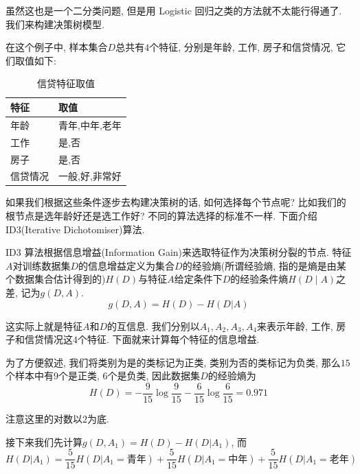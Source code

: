 \documentclass[a4paper,UTF8]{ctexart}
\theoremstyle{plain} \newtheorem{theorem}{定理}[section]
\theoremstyle{plain} \newtheorem{definition}{定义}[section]
\theoremstyle{plain} \newtheorem{lemma}{引理}[section]
\theoremstyle{plain} \newtheorem{proposition}{命题}[section]
\theoremstyle{plain} \newtheorem{example}{例}
\theoremstyle{plain} \newtheorem{remark}{注}
\theoremstyle{plain} \newtheorem{corollary}{推论}[section]
\begin{document}
虽然这也是一个二分类问题, 但是用 Logistic 回归之类的方法就不太能行得通了. 我们来构建决策树模型.

在这个例子中, 样本集合$D$总共有$4$个特征, 分别是年龄, 工作, 房子和信贷情况, 它们取值如下:
\begin{table}[!htb]
\centering
\caption{信贷特征取值}
\label{xindaivalue}
\begin{tabularx}{10cm}{XX}
  \hline
    \textbf{特征} & \textbf{取值}  \\
    \hline
    年龄   &  青年,中年,老年 \\
    \hline
    工作   &  是,否 \\
    \hline
    房子   &  是,否 \\
    \hline
    信贷情况   &  一般,好,非常好 \\
  \hline
\end{tabularx}
\end{table}

如果我们根据这些条件逐步去构建决策树的话, 如何选择每个节点呢? 比如我们的根节点是选年龄好还是选工作好? 不同的算法选择的标准不一样. 下面介绍 ID3(Iterative Dichotomiser)算法.

ID3 算法根据信息增益(Information Gain)来选取特征作为决策树分裂的节点. 特征$A$对训练数据集$D$的信息增益定义为集合$D$的经验熵(所谓经验熵, 指的是熵是由某个数据集合估计得到的)$H(D)$与特征$A$给定条件下$D$的经验条件熵$H(D∣A)$之差, 记为$g(D, A)$.
\begin{equation*}
g(D, A) = H(D) - H(D | A)
\end{equation*}

这实际上就是特征$A$和$D$的互信息. 我们分别以$A_1, A_2, A_3, A_4$来表示年龄, 工作, 房子和信贷情况这$4$个特征. 下面就来计算每个特征的信息增益.

为了方便叙述, 我们将类别为是的类标记为正类, 类别为否的类标记为负类, 那么$15$个样本中有$9$个是正类, $6$个是负类, 因此数据集$D$的经验熵为
\begin{equation*}
H(D) = - \frac{9}{15} \log \frac{9}{15} - \frac{6}{15} \log \frac{6}{15} = 0.971
\end{equation*}

注意这里的对数以$2$为底.

接下来我们先计算$g(D, A_{1}) = H(D) - H(D | A_{1})$, 而
\begin{equation}\label{age}
H(D|A_{1}) = \frac{5}{15} H(D|A_{1} = \textrm{青年}) + \frac{5}{15} H(D|A_{1} = \textrm{中年}) + \frac{5}{15} H(D|A_{1} = \textrm{老年})
\end{equation}
\end{document}
